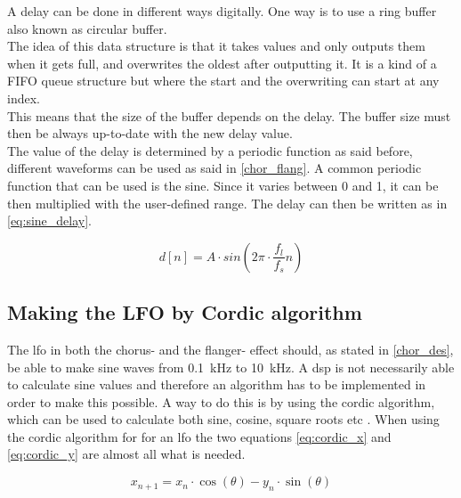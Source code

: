 A delay can be done in different ways digitally. One way is to use a ring buffer also known as circular buffer. \\
The idea of this data structure is that it takes values and only outputs them when it gets full, and overwrites the oldest after outputting it. It is a kind of a FIFO queue structure but where the start and the overwriting can start at any index. \\
This means that the size of the buffer depends on the delay.  The buffer size must then be always up-to-date with the new delay value. \\ 
The value of the delay is determined by a periodic function as said before, different waveforms can be used as said in \autoref{chor_flang}. A common periodic function that can be used is the sine. Since it varies between 0 and 1, it can be then multiplied with the user-defined range. 
The delay can then be written as in \autoref{eq:sine_delay}.

\begin{equation}\label{eq:sine_delay}
	d[n]= A \cdot sin(2\pi  \cdot \frac{f_{l}}{f_{s}} n)
\end{equation}

\startexplain
    \stopexplain 

\subsection{Making the LFO by Cordic algorithm}
The \gls{lfo} in both the chorus- and the flanger- effect should, as stated in \autoref{chor_des}, be able to make sine waves from \SI{0.1}{\kilo\hertz} to \SI{10}{\kilo\hertz}. A \gls{dsp} is not necessarily able to calculate sine values and therefore an algorithm has to be implemented in order to make this possible. A way to do this is by using the \gls{cordic} algorithm, which can be used to calculate both sine, cosine, square roots etc \citep{cordic}. 
When using the \gls{cordic} algorithm for for an \gls{lfo} the two equations \autoref{eq:cordic_x} and \autoref{eq:cordic_y} are almost all what is needed.

\begin{equation}
\label{eq:cordic_x}
		x_{n+1} = x_n \cdot \cos(\theta) - y_n \cdot \sin(\theta) 
\end{equation}
\startexplain
    \stopexplain 

